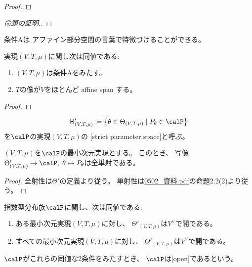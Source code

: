 \documentclass[report]{jlreq}
\begin{document}
\begin{proof}
    \TODO{}
\end{proof}

\begin{proof}[命題の証明.]
    \TODO{}
\end{proof}

条件Aは
アファイン部分空間の言葉で特徴づけることができる。

\begin{proposition}
    実現$(V, T, \mu)$に関し次は同値である:
    \begin{enumerate}
        \item $(V, T, \mu)$は条件Aをみたす。
        \item $T$の像が$V$をほとんど affine span する。
    \end{enumerate}
\end{proposition}

\begin{proof}
    \TODO{}
\end{proof}

\begin{definition}
    \begin{equation}
        \Theta'_{(V, T, \mu)} \coloneqq \mybrace{
            \theta \in \Theta_{(V, T, \mu)}
            \mid
            P_\theta \in \calP
        }
    \end{equation}
    を$\calP$の実現$(V, T, \mu)$の
    [strict parameter space]と呼ぶ。
\end{definition}

\begin{proposition}
    $(V, T, \mu)$を$\calP$の最小次元実現とする。
    このとき、
    写像$\Theta'_{(V, T, \mu)} \to \calP, \;
        \theta \mapsto P_\theta$は全単射である。
\end{proposition}

\begin{proof}
    全射性は$\Theta'$の定義より従う。
    単射性は\url{0502_資料.pdf}の命題2.2(2)より従う。
\end{proof}

\begin{propdef}
    指数型分布族$\calP$に関し、次は同値である:
    \begin{enumerate}
        \item ある最小次元実現$(V, T, \mu)$に対し、
            $\Theta'_{(V, T, \mu)}$は$V^\vee$で開である。
        \item すべての最小次元実現$(V, T, \mu)$に対し、
            $\Theta'_{(V, T, \mu)}$は$V^\vee$で開である。
    \end{enumerate}
    $\calP$がこれらの同値な2条件をみたすとき、
    $\calP$は[open]であるという。
\end{propdef}
\end{document}
